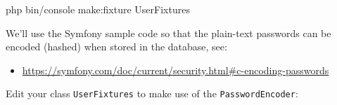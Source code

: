 \documentclass[a4paperpaper,openright]{book}
\newenvironment{Shaded}{}{}
\newcommand{\ExtensionTok}[1]{#1}
\newcommand{\NormalTok}[1]{#1}
\providecommand{\tightlist}{%
  \setlength{\itemsep}{0pt}\setlength{\parskip}{0pt}}
\begin{document}
\begin{Shaded}
\begin{Highlighting}[]
    \ExtensionTok{php}\NormalTok{ bin/console make:fixture UserFixtures}
\end{Highlighting}
\end{Shaded}

We'll use the Symfony sample code so that the plain-text passwords can
be encoded (hashed) when stored in the database, see:

\begin{itemize}
\tightlist
\item
  \url{https://symfony.com/doc/current/security.html\#c-encoding-passwords}
\end{itemize}

Edit your class \texttt{UserFixtures} to make use of the
\texttt{PasswordEncoder}:
\end{document}

